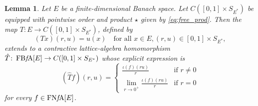 \documentclass{memo-l}
\newtheorem{lem}[theorem]{Lemma}
\theoremstyle{definition}
\theoremstyle{remark}
\numberwithin{section}{chapter}
\numberwithin{equation}{chapter}
\newcommand{\FNFA}[1]{\operatorname{FN{\it f}\!A}[#1]}
\newcommand{\FBFA}[1]{\operatorname{FB{\it f}\!A}[#1]}
\begin{document}
\begin{lem}\label{lem:finite_prelim2}
    Let $E$ be a finite-dimensional Banach space. Let $C([0,1]\times
    S_{E^{*}})$ be equipped with pointwise order and product $\star$ given by
    \eqref{eq:free_prod}. Then the map $T\colon E\to C([0,1]\times
    S_{E^{*}})$, defined by
    \[
        (Tx)(r,u)=u(x)\quad\text{for all }x \in E, (r,u)\in
        [0,1]\times S_{E^{*}},
    \]
    extends to a contractive lattice-algebra homomorphism
    $\hat{T}\colon \FBFA E\to C([0,1]\times S_{E^{*}})$ whose explicit
    expression is
    \[
        (\hat{T}f)(r,u)=
    \begin{cases}
        \displaystyle\frac{\iota (f)(ru)}{r}&\text{if }r\neq 0\\
        \displaystyle\lim_{r\to 0^{+}}\frac{\iota (f)(ru)}{r}&\text{if }r=0
    \end{cases}
    \]
    for every $f \in \FNFA E$.
\end{lem}
\end{document}
